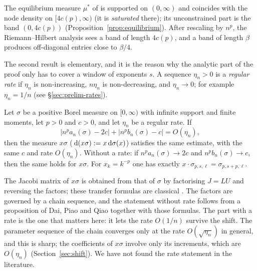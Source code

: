 \begin{remark}\label{rem:pure-constant}
The equilibrium measure $\mu^*$ of \cite{Paper1} is supported on $(0,\infty)$ and coincides with the node density on
$[4c(p),\infty)$ (it is \emph{saturated} there); its unconstrained part is the band $(0,4c(p))$
(Proposition~\ref{prop:equilibrium}). After rescaling by $n^p$, the Riemann--Hilbert analysis sees a band of length
$4c(p)$, and a band of length $\beta$ produces off-diagonal entries close to $\beta/4$.
\end{remark}

The second result is elementary, and it is the reason why the analytic part of the proof only has to cover a window
of exponents $s$. A sequence $\eta_n>0$ is a \emph{regular rate} if $\eta_n$ is non-increasing, $n\eta_n$ is
non-decreasing, and $\eta_n\to0$; for example $\eta_n=1/n$ (see \S\ref{sec:prelim-rates}).

\begin{maintheorem}\label{thm:shift}
Let $\sigma$ be a positive Borel measure on $[0,\infty)$ with infinite support and finite moments, let $p>0$ and
$c>0$, and let $\eta_n$ be a regular rate. If
\[
  |n^pa_n(\sigma)-2c|+|n^pb_n(\sigma)-c|=O(\eta_n),
\]
then the measure $x\sigma$ \textup{(}$\,\mathrm{d}(x\sigma):=x\,\mathrm{d}\sigma(x)$\textup{)} satisfies the same estimate, with
the same $c$ and rate $O(\eta_n)$. Without a rate: if $n^pa_n(\sigma)\to2c$ and $n^pb_n(\sigma)\to c$, then the same
holds for $x\sigma$. For $x_k=k^{-p}$ one has exactly $x\cdot\sigma_{p,s,\ell}=\sigma_{p,s+p,\ell}$.
\end{maintheorem}

\begin{remark}\label{rem:shift-credit}
The Jacobi matrix of $x\sigma$ is obtained from that of $\sigma$ by factorising $J=LU$ and reversing the factors; these
transfer formulas are classical \cite[\S1]{DD}. The factors are governed by a chain sequence, and the statement
without rate follows from a proposition of Dai, Piao and Qiao \cite[Proposition~2.1]{DPQ} together with those formulas.
The part with a rate is the one that matters here: it lets the rate $O(1/n)$ survive the shift. The parameter
sequence of the chain converges only at the rate $O(\sqrt{\eta_n})$ in general, and this is sharp; the coefficients of
$x\sigma$ involve only its increments, which are $O(\eta_n)$ (Section~\ref{sec:shift}). We have not found the rate
statement in the literature.
\end{remark}

